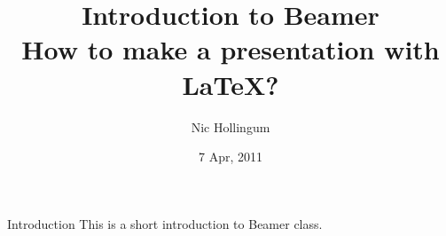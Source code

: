 \documentclass{beamer}
\title[Make a LaTeX presentation using Beamer]{Introduction  to Beamer\\How to make a presentation with LaTeX?}
\author{Nic Hollingum}
\institute{USYD}
\date{7 Apr, 2011}
\begin{document}
\begin{frame}
\titlepage
\end{frame}


\begin{frame}{Introduction}
This is a short introduction to Beamer class.
\end{frame}
\end{document}
